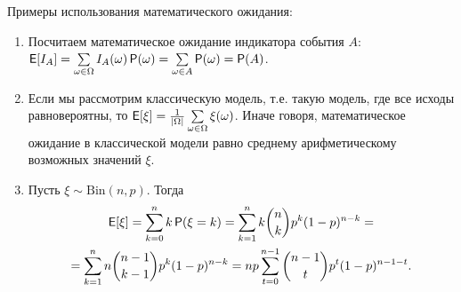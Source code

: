 Примеры использования математического ожидания:
\begin{enumerate}
    \item Посчитаем математическое ожидание индикатора события \(A\): \\ \(\operatorname{\mathsf{E}}[I_A] = \sum\limits_{\omega \in \Omega} I_A(\omega)\operatorname{\mathsf{P}}(\omega) = \sum\limits_{\omega \in A} \operatorname{\mathsf{P}}(\omega) = \operatorname{\mathsf{P}}(A)\).
    
    \item Если мы рассмотрим классическую модель, т.е. такую модель, где все исходы равновероятны, то \(\operatorname{\mathsf{E}}[\xi] = \frac{1}{|\Omega|}\sum\limits_{\omega \in \Omega}\xi(\omega)\). Иначе говоря, математическое ожидание в классической модели равно среднему арифметическому возможных значений \(\xi\).
    
    \item Пусть $\xi \sim \mathrm{Bin}(n, p)$. Тогда
    \begin{multline*}
        \operatorname{\mathsf{E}}[\xi] =
        \sum\limits_{k = 0}^{n} k\operatorname{\mathsf{P}}(\xi = k) =
        \sum\limits_{k = 1}^{n} k\binom{n}{k}p^{k}(1 - p)^{n - k} =\\=
        \sum\limits_{k = 1}^{n} n\binom{n - 1}{k - 1}p^{k}(1 - p)^{n - k} =
        np \sum\limits_{t=0}^{n-1} \binom{n - 1}{t}p^{t}(1 - p)^{n - 1 - t}.
    \end{multline*}
\end{enumerate}

